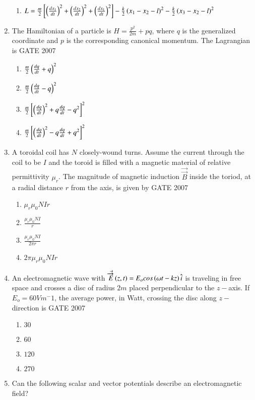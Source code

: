 \documentclass[journal]{IEEEtran}
\begin{document}
\begin{enumerate}
\begin{enumerate}
       \item $L = \frac{m}{2}{}\left[\left(\frac{dx_1}{dt}\right)^2 +\left(\frac{dx_2}{dt}\right)^2 +\left(\frac{dx_1}{dt}\right)^2\right]-\frac{k}{2}\left(x_1-x_2-l\right)^2 - \frac{k}{2}\left(x_3 - x_2 - l\right)^2$
\end{enumerate}
\item The Hamiltonian of a particle is $H = \frac{p^2}{2m} + pq$, where $q$ is the generalized coordinate and $p$ is the corresponding canonical momentum. The Lagrangian is \hfill{GATE 2007}
\begin{enumerate}
    \item $\frac{m}{2}\left(\frac{dq}{dt} + q\right)^2$
    \item $\frac{m}{2}\left(\frac{dq}{dt} - q\right)^2$
    \item $\frac{m}{2}{}\left[\left(\frac{dq}{dt}\right)^2 + q\frac{dq}{dt}-q^2\right]^2$
    \item $\frac{m}{2}{}\left[\left(\frac{dq}{dt}\right)^2 - q\frac{dq}{dt}+q^2\right]^2$
\end{enumerate}
\item A toroidal coil has $N$ closely-wound turns. Assume the current through the coil to be $I$ and the toroid is filled with a magnetic material of relative permittivity $\mu_r$. The magnitude of magnetic induction $\Vec{\overrightarrow{B}}$ inside the toriod, at a radial distance $r$ from the axis, is given by 
\hfill{GATE 2007}\begin{enumerate}
    \item $\mu_r\mu_0NIr$
    \item $\frac{\mu_r\mu_0NI}{r}$
    \item $\frac{\mu_r\mu_0NI}{2\pi r}$
    \item $2\pi\mu_r\mu_0NIr$
\end{enumerate}
\item An electromagnetic wave with $\Vec{\overrightarrow{E
}}\left(z,t\right) = E_ocos\left(\omega t-kz\right)\hat{i}$ is traveling in free space and crosses a disc of radius $2 m$ placed perpendicular to the $z-$axis. If $E_o = 60 V m^-1$, the average power, in Watt, crossing the disc along $z-$direction is 
\hfill{GATE 2007}\begin{enumerate}
    \item $30$
    \item $60$
    \item $120$
    \item $270$
\end{enumerate}
\item Can the following scalar and vector potentials describe an electromagnetic field? \\

\end{enumerate}
\end{document}
